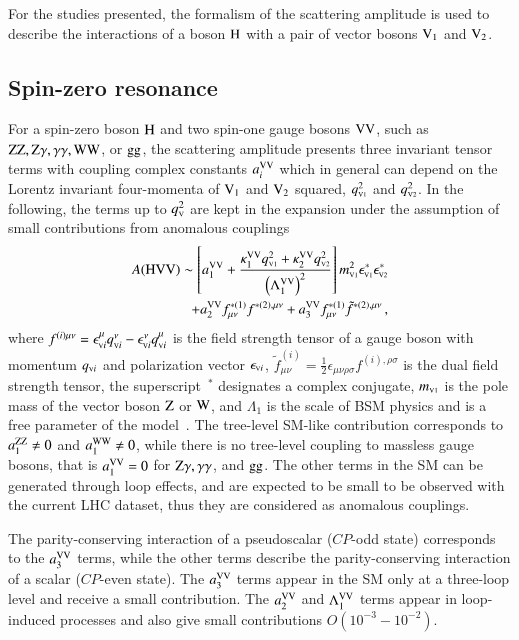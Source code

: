 For the studies presented, the formalism of the scattering amplitude is used
to describe the interactions of a boson $\mathrm{H}$ with a pair of vector bosons $\mathrm{V}_1$ and $\mathrm{V}_2$.

\subsection{Spin-zero resonance}
For a spin-zero boson $\mathrm{H}$ and two spin-one gauge bosons $\mathrm{V}\mathrm{V}$, such
as $\mathrm{Z}\mathrm{Z}, \mathrm{Z} \gamma, \gamma\gamma, \mathrm{W}\mathrm{W}$, or $\mathrm{g}\mathrm{g}$, the scattering amplitude
presents three invariant tensor terms with coupling complex constants $a_{i}^{\mathrm{V}\mathrm{V}}$
which in general can depend on the Lorentz invariant four-momenta
of $\mathrm{V}_1$ and $\mathrm{V}_2$ squared, $q_{\scriptscriptstyle\mathrm{V}1}^2$ and $q_{\scriptscriptstyle\mathrm{V}2}^2$. 
In the following, the terms up to $q_{\scriptscriptstyle\mathrm{V}}^2$  are kept in the expansion under the assumption 
of small contributions from anomalous couplings
%
\begin{eqnarray}
A(\mathrm{H}\mathrm{V}\mathrm{V}) \sim 
\left[ a_{1}^{\mathrm{V}\mathrm{V}} 
+ \frac{\kappa_1^{\mathrm{V}\mathrm{V}}q_{\scriptscriptstyle\mathrm{V}1}^2 + \kappa_2^{\mathrm{V}\mathrm{V}} q_{\scriptscriptstyle\mathrm{V}2}^{2}}{\left(\Lambda_{1}^{\mathrm{V}\mathrm{V}} \right)^{2}} \right] 
m_{\scriptscriptstyle\mathrm{V}1}^2 \epsilon_{\scriptscriptstyle\mathrm{V}1}^* \epsilon_{\scriptscriptstyle\mathrm{V}2}^* \\ \nonumber
+ a_{2}^{\mathrm{V}\mathrm{V}}  f_{\mu \nu}^{*(1)}f^{*(2),\mu\nu} 
+ a_{3}^{\mathrm{V}\mathrm{V}}   f^{*(1)}_{\mu \nu} {\tilde f}^{*(2),\mu\nu}\,,
\label{eq:formfact-fullampl-spin0} 
\end{eqnarray}
%
where $f^{(i){\mu \nu}} =
\epsilon_{{\scriptscriptstyle\mathrm{V}}i}^{\mu}q_{{\scriptscriptstyle\mathrm{V}}i}^{\nu} -
\epsilon_{{\scriptscriptstyle\mathrm{V}}i}^\nu q_{{\scriptscriptstyle\mathrm{V}}i}^{\mu} $ is the field strength
tensor of a gauge boson with momentum $q_{{\scriptscriptstyle\mathrm{V}}i}$ and polarization
vector $\epsilon_{{\scriptscriptstyle\mathrm{V}}i}$, ${\tilde f}^{(i)}_{\mu \nu} =
\frac{1}{2} \epsilon_{\mu\nu\rho\sigma} f^{(i),\rho\sigma}$ is the
dual field strength tensor, the superscript~$^*$ designates a complex
conjugate, $m_{\scriptscriptstyle\mathrm{V}1}$ is the pole mass of the vector boson $\mathrm{Z}$ or
$\mathrm{W}$, and $\Lambda_{1}$ is the scale of BSM physics and is a free
parameter of the model~\cite{Anderson:2013afp}. The tree-level SM-like
contribution corresponds to $a_{1}^{\mathrm{Z}\mathrm{Z}}\ne 0$ and $a_{1}^{\mathrm{W}\mathrm{W}}
\ne 0$, while there is no tree-level coupling to massless gauge
bosons, that is $a_{1}^{\mathrm{V}\mathrm{V}}= 0$ for $\mathrm{Z} \gamma, \gamma\gamma$, and
$\mathrm{g}\mathrm{g}$. The other terms in the SM can be generated through loop
effects, and are expected to be small to be observed with the
current LHC dataset, thus they are considered as anomalous couplings.

The parity-conserving interaction of a pseudoscalar ($CP$-odd state)
corresponds to the $a_{3}^{\mathrm{V}\mathrm{V}}$ terms, while the other terms
describe the parity-conserving interaction of a scalar ($CP$-even
state).  The $a_{3}^{\mathrm{V}\mathrm{V}}$ terms appear in the SM only at a
three-loop level and receive a small contribution.  The $a_{2}^{\mathrm{V}\mathrm{V}}$
and $\Lambda_{1}^{\mathrm{V}\mathrm{V}}$ terms appear in loop-induced processes and
also give small contributions $O(10^{-3} - 10^{-2})$.

